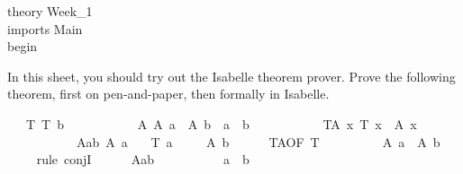 \begin{isabellebody}
\begin{isamarkuptext}
\noindent theory Week\_1\\
imports Main\\
begin%
\end{isamarkuptext}\isamarkuptrue%
%
\begin{isamarkuptext}%
%
\end{isamarkuptext}\isamarkuptrue%
%
\begin{isamarkuptext}%
In this sheet, you should try out the Isabelle theorem prover.
Prove the following theorem, first on pen-and-paper, then formally in Isabelle.%
\end{isamarkuptext}\isamarkuptrue%
\isamarkupfalse%
\isanewline
\ \ \ T{\isacharcolon}{\kern0pt}\ {\isachardoublequoteopen}T\ b{\isachardoublequoteclose}\isanewline
\ \ \ \ \ \ \ \ \ \ \ A{\isacharcolon}{\kern0pt}\ {\isachardoublequoteopen}A\ a\ {\isasymand}\ A\ b\ {\isasymLongrightarrow}\ a\ {\isacharequal}{\kern0pt}\ b{\isachardoublequoteclose}\isanewline
\ \ \ \ \ \ \ \ \ \ \ TA{\isacharcolon}{\kern0pt}\ {\isachardoublequoteopen}{\isasymAnd}x{\isachardot}{\kern0pt}\ T\ x\ {\isasymLongrightarrow}\ A\ x{\isachardoublequoteclose}\isanewline
\ \ \ \ \ \ \ \ \ \ \ Aab{\isacharcolon}{\kern0pt}\ {\isachardoublequoteopen}A\ a{\isachardoublequoteclose}\isanewline
\ \ \ {\isachardoublequoteopen}T\ a{\isachardoublequoteclose}\isanewline
%
\isadelimproof
\isanewline
%
\endisadelimproof
%
\isatagproof
{}\isamarkupfalse%
{\isacharminus}{\kern0pt}\isanewline
\isanewline
\ \ \isamarkupfalse%
\ {}{\isacharcolon}{\kern0pt}\ {\isachardoublequoteopen}A\ b{\isachardoublequoteclose}\isanewline
\ \ \ \ \isamarkupfalse%
\ TA{\isacharbrackleft}{\kern0pt}OF\ T{\isacharbrackright}{\kern0pt}\isanewline
\ \ \ \ \isacommand{{\isachardot}{\kern0pt}}\isamarkupfalse%
\isanewline
\isanewline
\ \ \isamarkupfalse%
\ {}{\isacharcolon}{\kern0pt}\ {\isachardoublequoteopen}A\ a\ {\isasymand}\ A\ b{\isachardoublequoteclose}\isanewline
\ \ \ \ \isamarkupfalse%
{\isacharparenleft}{\kern0pt}rule\ conjI{\isacharparenright}{\kern0pt}\isanewline
\ \ \ \ \isamarkupfalse%
\ Aab\ {}\isanewline
\ \ \ \ \isacommand{{\isachardot}{\kern0pt}}\isamarkupfalse%
\isanewline
\isanewline
\isanewline
\ \ \isamarkupfalse%
\ {}{\isacharcolon}{\kern0pt}\ {\isachardoublequoteopen}a\ {\isacharequal}{\kern0pt}\ b{\isachardoublequoteclose}\isanewline

\end{isabellebody}
